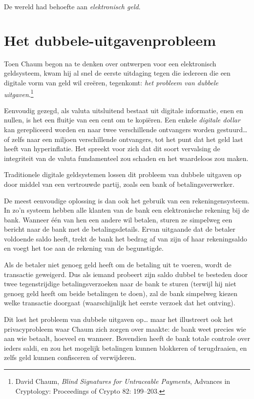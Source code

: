 \documentclass[
  a5paper,
  smalldemyvopaper,11pt,twoside,onecolumn,openright,extrafontsizes,
hidelinks]{memoir}
\begin{document}
De wereld had behoefte aan \emph{elektronisch geld}.

\section{Het
dubbele-uitgavenprobleem}\label{het-dubbele-uitgavenprobleem}

Toen Chaum begon na te denken over ontwerpen voor een elektronisch
geldsysteem, kwam hij al snel de eerste uitdaging tegen die iedereen die
een digitale vorm van geld wil creëren, tegenkomt: \emph{het probleem
van dubbele uitgaven}.\footnote{David Chaum, \emph{Blind Signatures for
  Untraceable Payments}, Advances in Cryptology: Proceedings of Crypto
  82: 199--203.}

Eenvoudig gezegd, als valuta uitsluitend bestaat uit digitale
informatie, enen en nullen, is het een fluitje van een cent om te
kopiëren. Een enkele \emph{digitale dollar} kan gerepliceerd worden en
naar twee verschillende ontvangers worden gestuurd\ldots{} of zelfs naar
een miljoen verschillende ontvangers, tot het punt dat het geld last
heeft van hyperinflatie. Het spreekt voor zich dat dit soort vervalsing
de integriteit van de valuta fundamenteel zou schaden en het waardeloos
zou maken.

Traditionele digitale geldsystemen lossen dit probleem van dubbele
uitgaven op door middel van een vertrouwde partij, zoals een bank of
betalingsverwerker.

De meest eenvoudige oplossing is dan ook het gebruik van een
rekeningensysteem. In zo'n systeem hebben alle klanten van de bank een
elektronische rekening bij de bank. Wanneer één van hen een andere wil
betalen, sturen ze simpelweg een bericht naar de bank met de
betalingsdetails. Ervan uitgaande dat de betaler voldoende saldo heeft,
trekt de bank het bedrag af van zijn of haar rekeningsaldo en voegt het
toe aan de rekening van de begunstigde.

Als de betaler niet genoeg geld heeft om de betaling uit te voeren,
wordt de transactie geweigerd. Dus als iemand probeert zijn saldo dubbel
te besteden door twee tegenstrijdige betalingsverzoeken naar de bank te
sturen (terwijl hij niet genoeg geld heeft om beide betalingen te doen),
zal de bank simpelweg kiezen welke transactie doorgaat (waarschijnlijk
het eerste verzoek dat het ontving).

Dit lost het probleem van dubbele uitgaven op\ldots{} maar het
illustreert ook het privacyprobleem waar Chaum zich zorgen over maakte:
de bank weet precies wie aan wie betaalt, hoeveel en wanneer. Bovendien
heeft de bank totale controle over ieders saldi, en zou het mogelijk
betalingen kunnen blokkeren of terugdraaien, en zelfs geld kunnen
confisceren of verwijderen.
\end{document}
